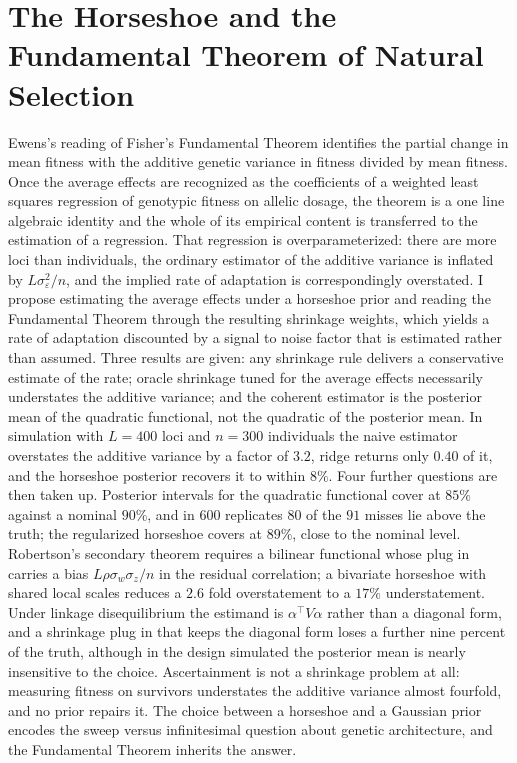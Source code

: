 \chapter{The Horseshoe and the Fundamental Theorem of Natural Selection}\label{ch:hs}
\begin{chaptersummary}
Ewens's reading of Fisher's Fundamental Theorem identifies the partial change in mean fitness with the additive genetic variance in fitness divided by mean fitness. Once the average effects are recognized as the coefficients of a weighted least squares regression of genotypic fitness on allelic dosage, the theorem is a one line algebraic identity and the whole of its empirical content is transferred to the estimation of a regression. That regression is overparameterized: there are more loci than individuals, the ordinary estimator of the additive variance is inflated by $L\sigma^2_\varepsilon/n$, and the implied rate of adaptation is correspondingly overstated. I propose estimating the average effects under a horseshoe prior and reading the Fundamental Theorem through the resulting shrinkage weights, which yields a rate of adaptation discounted by a signal to noise factor that is estimated rather than assumed. Three results are given: any shrinkage rule delivers a conservative estimate of the rate; oracle shrinkage tuned for the average effects necessarily understates the additive variance; and the coherent estimator is the posterior mean of the quadratic functional, not the quadratic of the posterior mean. In simulation with $L = 400$ loci and $n = 300$ individuals the naive estimator overstates the additive variance by a factor of $3.2$, ridge returns only $0.40$ of it, and the horseshoe posterior recovers it to within $8\%$. Four further questions are then taken up. Posterior intervals for the quadratic functional cover at $85\%$ against a nominal $90\%$, and in $600$ replicates $80$ of the $91$ misses lie above the truth; the regularized horseshoe covers at $89\%$, close to the nominal level. Robertson's secondary theorem requires a bilinear functional whose plug in carries a bias $L\rho\sigma_w\sigma_z/n$ in the residual correlation; a bivariate horseshoe with shared local scales reduces a $2.6$ fold overstatement to a $17\%$ understatement. Under linkage disequilibrium the estimand is $\alpha^\top V\alpha$ rather than a diagonal form, and a shrinkage plug in that keeps the diagonal form loses a further nine percent of the truth, although in the design simulated the posterior mean is nearly insensitive to the choice. Ascertainment is not a shrinkage problem at all: measuring fitness on survivors understates the additive variance almost fourfold, and no prior repairs it. The choice between a horseshoe and a Gaussian prior encodes the sweep versus infinitesimal question about genetic architecture, and the Fundamental Theorem inherits the answer.
\end{chaptersummary}
